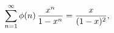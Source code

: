 \[\sum_{n=1}^{\infty}\mathop{\phi\/}\nolimits\!\left(n\right)\frac{x^{n}}{1-x^{n%
}}=\frac{x}{(1-x)^{2}},\]
